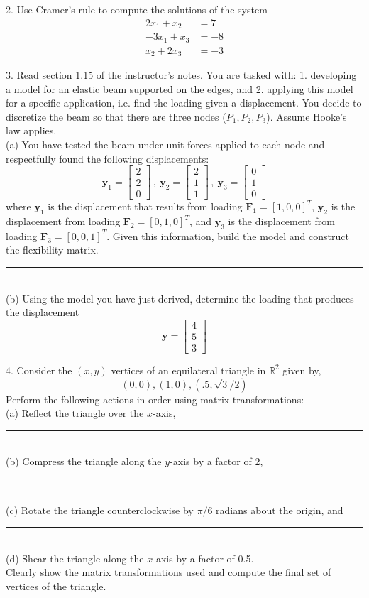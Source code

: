 \documentclass[12pt]{article}
\newcommand{\pagebar}{
  \noindent\rule{\textwidth}{1pt}\\
}
\begin{document}
\newpage

2. Use Cramer's rule to compute the solutions of the system
$$
\begin{aligned}
2x_1 + x_2 &= 7 \\
-3x_1 + x_3 &= -8 \\
x_2 + 2x_3 &= -3
\end{aligned}
$$

\newpage

3. Read section 1.15 of the instructor's notes. You are tasked with: 1. developing a model
for an elastic beam supported on the edges, and 2. applying this model for a specific
application, i.e. find the loading given a displacement. You decide to discretize the
beam so that there are three nodes ($P_1, P_2, P_3$). Assume Hooke's law applies.\\
(a) You have tested the beam under unit forces applied to each node and respectfully
found the following displacements:
$$
\mathbf{y}_1 = \begin{bmatrix} 2 \\ 2 \\ 0 \end{bmatrix} \, , \ \mathbf{y}_2 = \begin{bmatrix} 2 \\ 1 \\ 1 \end{bmatrix} \, , \ \mathbf{y}_3 = \begin{bmatrix} 0 \\ 1 \\ 0 \end{bmatrix}
$$
where $\mathbf{y}_1$ is the displacement that results from loading $\mathbf{F}_1 = [1, 0, 0]^T$, $\mathbf{y}_2$ is
the displacement from loading $\mathbf{F}_2 = [0, 1, 0]^T$, and $\mathbf{y}_3$ is the displacement from
loading $\mathbf{F}_3 = [0, 0, 1]^T$.
Given this information, build the model and construct the flexibility matrix.\\
\pagebar
(b) Using the model you have just derived, determine the loading that produces the
displacement
$$
\mathbf{y} = \begin{bmatrix} 4 \\ 5 \\ 3 \end{bmatrix}
$$

\newpage

4. Consider the $(x, y)$ vertices of an equilateral triangle in $\mathbb{R}^2$ given by,
$$
(0,0), (1,0), (.5, \sqrt{3}/2)
$$
Perform the following actions in order using matrix transformations:\\
(a) Reflect the triangle over the $x$-axis,\\
\pagebar
(b) Compress the triangle along the $y$-axis by a factor of 2,\\
\pagebar
(c) Rotate the triangle counterclockwise by $\pi/6$ radians about the origin, and\\
\pagebar
(d) Shear the triangle along the $x$-axis by a factor of 0.5.\\
Clearly show the matrix transformations used and compute the final set of vertices of
the triangle.
\end{document}
